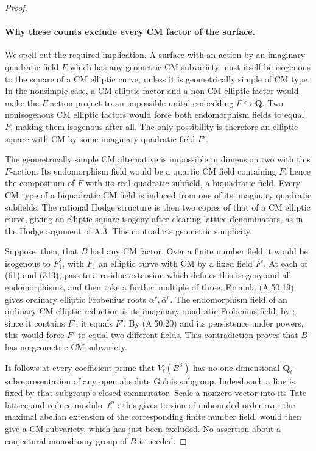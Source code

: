 \begin{proof}
\paragraph{Why these counts exclude every CM factor of the surface.}
We spell out the required implication. A surface
with an action by an imaginary quadratic field
\(F\) which has any geometric CM subvariety
must itself be isogenous to the square of a CM
elliptic curve, unless it is geometrically simple
of CM type. In the nonsimple case, a CM elliptic
factor and a non-CM elliptic factor would make the
\(F\)-action project to an impossible unital
embedding \(F\hookrightarrow\mathbf Q\).
Two nonisogenous CM elliptic factors would force
both endomorphism fields to equal \(F\), making
them isogenous after all. The only possibility
is therefore an elliptic square with CM by some
imaginary quadratic field \(F'\).

The geometrically simple CM alternative is impossible
in dimension two with this \(F\)-action. Its
endomorphism field would be a quartic CM field
containing \(F\), hence the compositum of \(F\)
with its real quadratic subfield, a biquadratic
field. Every CM type of a biquadratic CM field is
induced from one of its imaginary quadratic
subfields. The rational Hodge structure is then
two copies of that of a CM elliptic curve, giving
an elliptic-square isogeny after clearing lattice
denominators, as in the Hodge argument of A.3.
This contradicts geometric simplicity.

Suppose, then, that \(B\) had any CM factor.
Over a finite number field it would be isogenous
to \(F_1^2\), with \(F_1\) an elliptic curve
with CM by a fixed field \(F'\). At each of
(61) and (313), pass to a residue extension which
defines this isogeny and all endomorphisms, and
then take a further multiple of three. Formula
(A.50.19) gives ordinary elliptic Frobenius roots
\(\alpha^r,\bar\alpha^r\). The endomorphism
field of an ordinary CM elliptic reduction is
its imaginary quadratic Frobenius field, by
\cite[Theorem V.3.1]{fghSilvermanAEC}; since
it contains \(F'\), it equals \(F'\).
By (A.50.20) and its persistence under powers,
this would force \(F'\) to equal two different
fields. This contradiction proves that \(B\)
has no geometric CM subvariety.

It follows at every coefficient prime that
\(V_\ell(B^3)\) has no one-dimensional
\(\mathbf Q_\ell\)-subrepresentation of any
open absolute Galois subgroup. Indeed such a line
is fixed by that subgroup's closed commutator.
Scale a nonzero vector into its Tate lattice and
reduce modulo \(\ell^n\); this gives torsion
of unbounded order over the maximal abelian
extension of the corresponding finite number
field. \cite[\S1, Corollary 1]{Ruppert1998}
would then give a CM subvariety, which has just
been excluded. No assertion about a conjectural
monodromy group of \(B\) is needed.


\end{proof}
